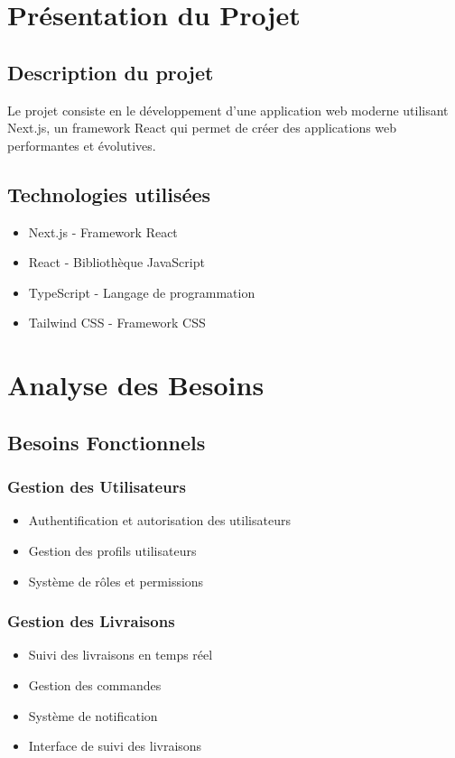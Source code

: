 \documentclass[12pt,a4paper]{report}
\begin{document}
\chapter{Présentation du Projet}
\section{Description du projet}
Le projet consiste en le développement d'une application web moderne utilisant Next.js, un framework React qui permet de créer des applications web performantes et évolutives.

\section{Technologies utilisées}
\begin{itemize}
    \item Next.js - Framework React
    \item React - Bibliothèque JavaScript
    \item TypeScript - Langage de programmation
    \item Tailwind CSS - Framework CSS
\end{itemize}

\chapter{Analyse des Besoins}
\section{Besoins Fonctionnels}
\subsection{Gestion des Utilisateurs}
\begin{itemize}
    \item Authentification et autorisation des utilisateurs
    \item Gestion des profils utilisateurs
    \item Système de rôles et permissions
\end{itemize}

\subsection{Gestion des Livraisons}
\begin{itemize}
    \item Suivi des livraisons en temps réel
    \item Gestion des commandes
    \item Système de notification
    \item Interface de suivi des livraisons
\end{itemize}
\end{document}
